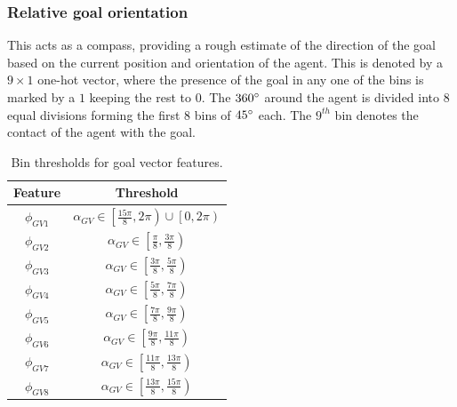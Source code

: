 \subsubsection*{Relative goal orientation} 
This acts as a compass, providing a rough estimate of the direction of the goal based on the current position and orientation of the agent. This is denoted by a $9 \times 1$ one-hot vector, where the presence of the goal in any one of the bins is marked by a $1$ keeping the rest to $0$. The $360 \degree$ around the agent is divided into $8$ equal divisions forming the first 8 bins of $45 \degree$ each. The $9^{th}$ bin denotes the contact of the agent with the goal.
\begin{table}[tbhp]
	\label{tab:goal-vector-bins}
	\begin{center}
		\begin{tabular}{|c|c|}
			\hline
			Feature & Threshold \\
			\hline
			$\phi_{GV1}$ & $\alpha_{GV} \in \left[ \frac{15\pi}{8} , 2\pi \right) \cup \left[ 0, 2\pi \right)$ \\
			
			$\phi_{GV2}$ & $\alpha_{GV} \in \left[ \frac{\pi}{8} , \frac{3\pi}{8} \right)$ \\
			
			$\phi_{GV3}$ & $\alpha_{GV} \in \left[ \frac{3\pi}{8} , \frac{5\pi}{8} \right)$ \\
			
			$\phi_{GV4}$ & $\alpha_{GV} \in \left[ \frac{5\pi}{8} , \frac{7\pi}{8} \right)$ \\
			
			$\phi_{GV5}$ & $\alpha_{GV} \in \left[ \frac{7\pi}{8} , \frac{9\pi}{8} \right)$ \\
			
			$\phi_{GV6}$ & $\alpha_{GV} \in \left[ \frac{9\pi}{8} , \frac{11\pi}{8} \right)$ \\
			
			$\phi_{GV7}$ & $\alpha_{GV} \in \left[ \frac{11\pi}{8} , \frac{13\pi}{8} \right)$ \\
			
			$\phi_{GV8}$ & $\alpha_{GV} \in \left[ \frac{13\pi}{8} , \frac{15\pi}{8} \right)$ \\
			\hline
		\end{tabular}
	\end{center}
	\caption{Bin thresholds for goal vector features.}
\end{table}

